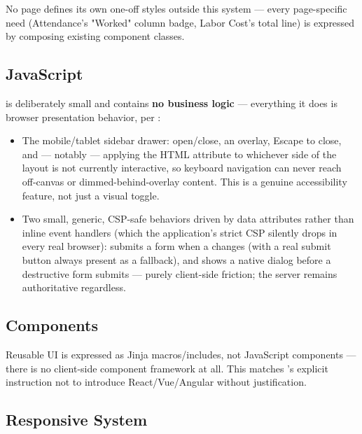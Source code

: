 No page defines its own one-off styles outside this system --- every
page-specific need (Attendance's "Worked" column badge, Labor Cost's
total line) is expressed by composing existing component classes.

\subsection*{JavaScript}

 is deliberately small and contains
\textbf{no business logic} --- everything it does is browser
presentation behavior, per :

\begin{itemize}[nosep]
  \item The mobile/tablet sidebar drawer: open/close, an overlay, Escape
        to close, and --- notably --- applying the HTML 
        attribute to whichever side of the layout is not currently
        interactive, so keyboard  navigation can never reach
        off-canvas or dimmed-behind-overlay content. This is a genuine
        accessibility feature, not just a visual toggle.
  \item Two small, generic, CSP-safe behaviors driven by data
        attributes rather than inline event handlers (which the
        application's strict CSP silently drops in every real browser):
         submits a form when a 
        changes (with a real submit button always present as a
        fallback), and \code{[data-confirm="..."]} shows a native
         dialog before a destructive form submits ---
        purely client-side friction; the server remains authoritative
        regardless.
\end{itemize}

\subsection*{Components}

Reusable UI is expressed as Jinja macros/includes, not JavaScript
components --- there is no client-side component framework at all.
This matches 's explicit instruction not to introduce
React/Vue/Angular without justification.

\subsection*{Responsive System}

